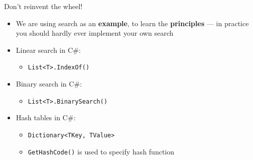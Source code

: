 \begin{frame}[fragile]{Don't reinvent the wheel!}
	\begin{itemize}
		\pause\item We are using search as an \textbf{example}, to learn the \textbf{principles} --- in practice
			you should hardly ever implement your own search
		\pause\item Linear search in C\#:
			\begin{itemize}
				\pause\item \lstinline{List<T>.IndexOf()}
			\end{itemize}
		\pause\item Binary search in C\#:
			\begin{itemize}
				\pause\item \lstinline{List<T>.BinarySearch()}
			\end{itemize}
		\pause\item Hash tables in C\#:
			\begin{itemize}
				\pause\item \lstinline{Dictionary<TKey, TValue>}
				\pause\item \lstinline{GetHashCode()} is used to specify hash function
			\end{itemize}
	\end{itemize}
\end{frame}
